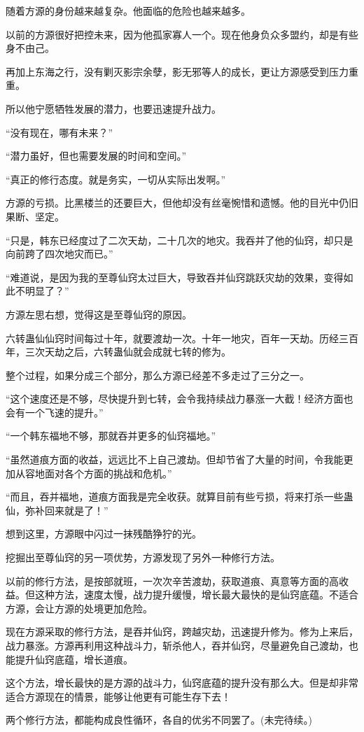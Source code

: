 \begin{this_body}
随着方源的身份越来越复杂。他面临的危险也越来越多。

以前的方源很好把控未来，因为他孤家寡人一个。现在他身负众多盟约，却是有些身不由己。

再加上东海之行，没有剿灭影宗余孽，影无邪等人的成长，更让方源感受到压力重重。

所以他宁愿牺牲发展的潜力，也要迅速提升战力。

“没有现在，哪有未来？”

“潜力虽好，但也需要发展的时间和空间。”

“真正的修行态度。就是务实，一切从实际出发啊。”

方源的亏损。比黑楼兰的还要巨大，但他却没有丝毫惋惜和遗憾。他的目光中仍旧果断、坚定。

“只是，韩东已经度过了二次天劫，二十几次的地灾。我吞并了他的仙窍，却只是向前跨了四次地灾而已。”

“难道说，是因为我的至尊仙窍太过巨大，导致吞并仙窍跳跃灾劫的效果，变得如此不明显了？”

方源左思右想，觉得这是至尊仙窍的原因。

六转蛊仙仙窍时间每过十年，就要渡劫一次。十年一地灾，百年一天劫。历经三百年，三次天劫之后，六转蛊仙就会成就七转的修为。

整个过程，如果分成三个部分，那么方源已经差不多走过了三分之一。

“这个速度还是不够，尽快提升到七转，会令我持续战力暴涨一大截！经济方面也会有一个飞速的提升。”

“一个韩东福地不够，那就吞并更多的仙窍福地。”

“虽然道痕方面的收益，远远比不上自己渡劫。但却节省了大量的时间，令我能更加从容地面对各个方面的挑战和危机。”

“而且，吞并福地，道痕方面我是完全收获。就算目前有些亏损，将来打杀一些蛊仙，弥补回来就是了！”

想到这里，方源眼中闪过一抹残酷狰狞的光。

挖掘出至尊仙窍的另一项优势，方源发现了另外一种修行方法。

以前的修行方法，是按部就班，一次次辛苦渡劫，获取道痕、真意等方面的高收益。但这种方法，速度太慢，战力提升缓慢，增长最大最快的是仙窍底蕴。不适合方源，会让方源的处境更加危险。

现在方源采取的修行方法，是吞并仙窍，跨越灾劫，迅速提升修为。修为上来后，战力暴涨。方源再利用这种战斗力，斩杀他人，吞并仙窍，尽量避免自己渡劫，也能提升仙窍底蕴，增长道痕。

这个方法，增长最快的是方源的战斗力，仙窍底蕴的提升没有那么大。但是却非常适合方源现在的情景，能够让他更有可能生存下去！

两个修行方法，都能构成良性循环，各自的优劣不同罢了。(未完待续。)

\end{this_body}

